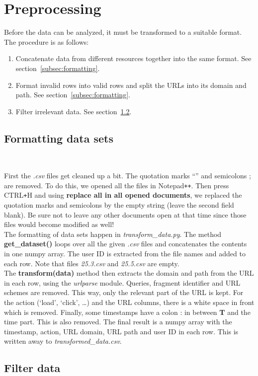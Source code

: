 
\section{Preprocessing}\label{sec:preprocessing}

Before the data can be analyzed, it must be transformed to a suitable format. The procedure is as follows:~\cite{article:markovmodel}

\begin{enumerate}
	\item Concatenate data from different resources together into the same format. See section~\ref{subsec:formatting}.
	\item Format invalid rows into valid rows and split the URLs into its domain and path. See section~\ref{subsec:formatting}.
	\item Filter irrelevant data. See section~\ref{subsec:filtering}.
\end{enumerate}

\subsection{Formatting data sets}~\label{subsec:formatting}

First the \textit{.csv} files get cleaned up a bit. The quotation marks ``'' and semicolons ; are removed. To do this, we opened all the files in Notepad\verb!++!. Then press CTRL\verb!+!H and using \textbf{replace all in all opened documents}, we replaced the quotation marks and semicolons by the empty string (leave the second field blank). Be sure not to leave any other documents open at that time since those files would become modified as well!
\\[2ex]
The formatting of data sets happen in \textit{transform\_data.py}. The method \textbf{get\_dataset()} loops over all the given \textit{.csv} files and concatenates the contents in one numpy array. The user ID is extracted from the file names and added to each row. Note that files \textit{25.3.csv} and \textit{25.5.csv} are empty.
\\[2ex]
The \textbf{transform(data)} method then extracts the domain and path from the URL in each row, using the \textit{urlparse} module. Queries, fragment identifier and URL schemes are removed. This way, only the relevant part of the URL is kept. For the action (`load', `click', \ldots) and the URL columns, there is a white space in front which is removed. Finally, some timestamps have a colon : in between \textbf{T} and the time part. This is also removed. The final result is a numpy array with the timestamp, action, URL domain, URL path and user ID in each row. This is written away to \textit{transformed\_data.csv}.


\subsection{Filter data}\label{subsec:filtering}
